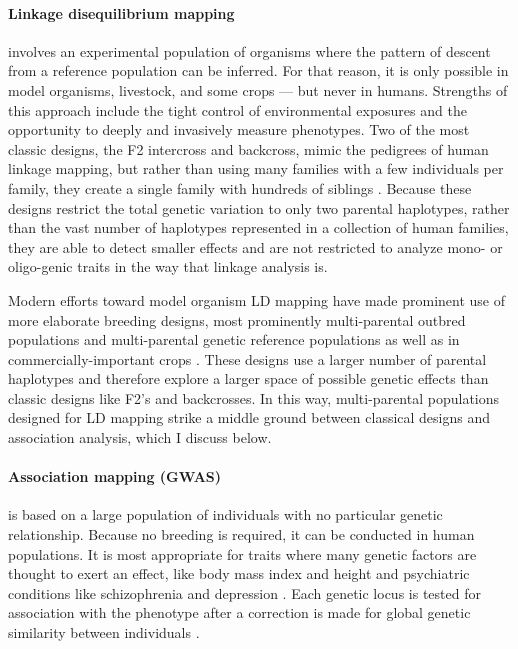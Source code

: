 \paragraph{Linkage disequilibrium mapping} involves an experimental population of organisms where the pattern of descent from a reference population can be inferred.
For that reason, it is only possible in model organisms, livestock, and some crops --- but never in humans.
Strengths of this approach include the tight control of environmental exposures and the opportunity to deeply and invasively measure phenotypes.
Two of the most classic designs, the F2 intercross and backcross, mimic the pedigrees of human linkage mapping, but rather than using many families with a few individuals per family, they create a single family with hundreds of siblings \citep{Lynch1998,Lander1987,Lander1989a}.
Because these designs restrict the total genetic variation to only two parental haplotypes, rather than the vast number of haplotypes represented in a collection of human families, they are able to detect smaller effects and are not restricted to analyze mono- or oligo-genic traits in the way that linkage analysis is.

Modern efforts toward model organism LD mapping have made prominent use of more elaborate breeding designs, most prominently multi-parental outbred populations \citep{Ghazalpour2012b,Svenson2012a} and multi-parental genetic reference populations \citep{TheComplexTraitConsortium2004,MacKay2012,King2012} as well as in commercially-important crops \citep{McMullen2009,Bandillo2013}.
These designs use a larger number of parental haplotypes and therefore explore a larger space of possible genetic effects than classic designs like F2's and backcrosses.
In this way, multi-parental populations designed for LD mapping strike a middle ground between classical designs and association analysis, which I discuss below.


\paragraph{Association mapping (GWAS)} is based on a large population of individuals with no particular genetic relationship.
Because no breeding is required, it can be conducted in human populations.
It is most appropriate for traits where many genetic factors are thought to exert an effect, like body mass index \citep{Speliotes2010,Locke2015} and height \citep{Allen2010,Wood2014-fh} and psychiatric conditions like schizophrenia \citep{Ripke2014a} and depression \citep{PGC2017}.
Each genetic locus is tested for association with the phenotype after a correction is made for global genetic similarity between individuals \citep{Lippert2011,Zhou2012}.

